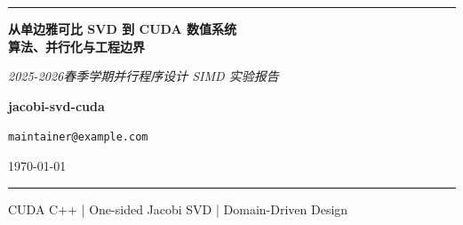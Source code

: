 ﻿\documentclass[11pt,a4paper]{article}
\makeatletter
\newcommand{\DocTitle}{从单边雅可比 SVD 到 CUDA 数值系统\\[0.35em]算法、并行化与工程边界}
\newcommand{\DocSubtitle}{2025-2026春季学期并行程序设计 SIMD 实验报告}
\newcommand{\DocAuthor}{jacobi-svd-cuda}
\newcommand{\DocEmail}{maintainer@example.com}
\newcommand{\DocDate}{\today}
\makeatother
\begin{document}
\begin{titlepage}
    \thispagestyle{empty}
    \centering

    \vspace*{2.2cm}
    {\color{blue!45!black}\rule{0.86\textwidth}{0.9pt}\par}
    \vspace{1.35cm}

    {\parbox{0.82\textwidth}{
            \centering
            \bfseries\color{blue!60!black}
            \setlength{\baselineskip}{1.42\baselineskip}
            \DocTitle\par
        }}

    \vspace{1.0cm}
    {\large\itshape\color{black!68}\DocSubtitle\par}

    \vfill

    \colorbox{blue!6}{
        \parbox{0.86\textwidth}{
            \centering
            \vspace{0.6cm}
            \vspace{0.25cm}
            {\Large\bfseries\DocAuthor\par}
            \vspace{0.15cm}
            {\normalsize\texttt{\DocEmail}\par}
            \vspace{0.45cm}
            {\normalsize\textsf{\DocDate}\par}
            \vspace{0.6cm}
        }
    }

    \vfill
    {\color{blue!35!black}\rule{0.86\textwidth}{0.9pt}\par}
    \vspace{0.35cm}
    {\small\textsf{CUDA C++ | One-sided Jacobi SVD | Domain-Driven Design}\par}
\end{titlepage}

\newpage
\tableofcontents
\newpage









\end{document}
